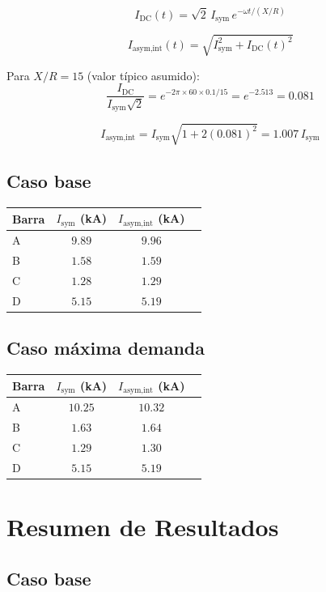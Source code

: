 \documentclass[12pt,a4paper]{article}
\begin{document}
\[
I_{\text{DC}}(t) = \sqrt{2}\,I_{\text{sym}}\,e^{-\omega t/(X/R)}
\]

\[
I_{\text{asym,int}}(t) = \sqrt{I_{\text{sym}}^2 + I_{\text{DC}}(t)^2}
\]

Para $X/R = 15$ (valor típico asumido):
\[
\frac{I_{\text{DC}}}{I_{\text{sym}}\sqrt{2}} = e^{-2\pi\times60\times0.1/15} = e^{-2.513} = 0.081
\]

\[
I_{\text{asym,int}} = I_{\text{sym}}\sqrt{1 + 2(0.081)^2} = 1.007\,I_{\text{sym}}
\]

\subsection{Caso base}

\begin{center}
\begin{tabular}{lccc}
\toprule
Barra & $I_{\text{sym}}$ (kA) & $I_{\text{asym,int}}$ (kA) \\
\midrule
A & $9.89$ & $9.96$ \\
B & $1.58$ & $1.59$ \\
C & $1.28$ & $1.29$ \\
D & $5.15$ & $5.19$ \\
\bottomrule
\end{tabular}
\end{center}

\subsection{Caso máxima demanda}

\begin{center}
\begin{tabular}{lccc}
\toprule
Barra & $I_{\text{sym}}$ (kA) & $I_{\text{asym,int}}$ (kA) \\
\midrule
A & $10.25$ & $10.32$ \\
B & $1.63$ & $1.64$ \\
C & $1.29$ & $1.30$ \\
D & $5.15$ & $5.19$ \\
\bottomrule
\end{tabular}
\end{center}

\section{Resumen de Resultados}

\subsection{Caso base}
\end{document}
